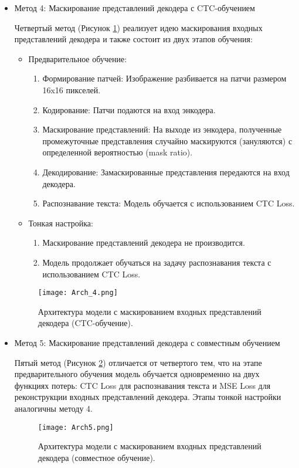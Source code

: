 \begin{itemize}

   \item Метод 4: Маскирование представлений декодера с CTC-обучением
   

   Четвертый метод (Рисунок \ref{6}) реализует идею маскирования входных представлений декодера и также состоит из двух этапов обучения:
   \begin{itemize}
     \item Предварительное обучение:
     \begin{enumerate}
        \item Формирование патчей: Изображение разбивается на патчи размером 16x16 пикселей.
        \item Кодирование: Патчи подаются на вход энкодера.
        \item Маскирование представлений: На выходе из энкодера, полученные промежуточные представления случайно маскируются (зануляются) с определенной вероятностью (mask ratio).
        \item Декодирование: Замаскированные представления передаются на вход декодера.
        \item Распознавание текста: Модель обучается с использованием CTC Loss.
     \end{enumerate}
     \item Тонкая настройка:
     \begin{enumerate}
        \item Маскирование представлений декодера не производится.
        \item Модель продолжает обучаться на задачу распознавания текста с использованием CTC Loss.
     \end{enumerate}
   \end{itemize}
   \begin{figure}[H]
     \centering
     \texttt{[image: Arch\_4.png]}
     \caption{Архитектура модели с маскированием входных представлений декодера (CTC-обучение).}
     \label{6} 
   \end{figure}

   \item Метод 5: Маскирование представлений декодера с совместным обучением
   
   Пятый метод (Рисунок \ref{7}) отличается от четвертого тем, что на этапе предварительного обучения модель обучается одновременно на двух функциях потерь: CTC Loss для распознавания текста и MSE Loss для реконструкции входных представлений декодера. Этапы тонкой настройки аналогичны методу 4.

   \begin{figure}[H]
     \centering
     \texttt{[image: Arch5.png]}
     \caption{Архитектура модели с маскированием входных представлений декодера (совместное обучение).}
     \label{7} 
   \end{figure}

\end{itemize}

